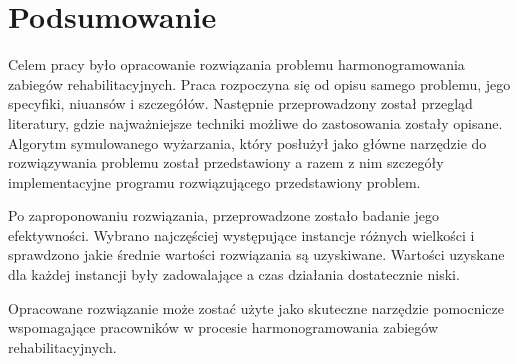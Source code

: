 \chapter{Podsumowanie}
Celem pracy było opracowanie rozwiązania problemu harmonogramowania zabiegów
rehabilitacyjnych. Praca rozpoczyna się od opisu samego problemu, jego
specyfiki, niuansów i szczegółów. Następnie przeprowadzony został przegląd
literatury, gdzie najważniejsze techniki możliwe do zastosowania zostały
opisane. Algorytm symulowanego wyżarzania, który posłużył jako główne narzędzie
do rozwiązywania problemu został przedstawiony a razem z nim szczegóły
implementacyjne programu rozwiązującego przedstawiony problem.

Po zaproponowaniu rozwiązania, przeprowadzone zostało badanie jego efektywności.
Wybrano najczęściej występujące instancje różnych wielkości i sprawdzono jakie
średnie wartości rozwiązania są uzyskiwane. Wartości uzyskane dla każdej
instancji były zadowalające a czas działania dostatecznie niski.

Opracowane rozwiązanie może zostać użyte jako skuteczne narzędzie pomocnicze
wspomagające pracowników w procesie harmonogramowania zabiegów
rehabilitacyjnych.
